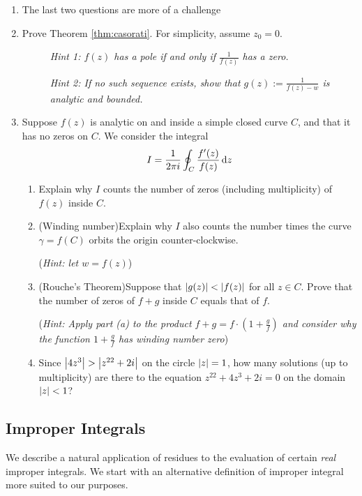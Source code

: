 \begin{exercises*}
\begin{enumerate}
  \item[]The last two questions are more of a challenge

	\item Prove Theorem \ref{thm:casorati}. For simplicity, assume $z_0=0$.
	\begin{description}  	
  	\item[]\emph{Hint 1: $f(z)$ has a pole if and only if $\frac 1{f(z)}$ has a zero.}
  	\item[]\emph{Hint 2: If no such sequence exists, show that $g(z):=\frac 1{f(z)-w}$ is analytic and bounded.}
	\end{description}
	
	  
  \item Suppose $f(z)$ is analytic on and inside a simple closed curve $C$, and that it has no zeros on $C$. We consider the integral
  \[I=\frac 1{2\pi i}\oint_C\frac{f'(z)}{f(z)}\,{\mathrm{d} z}\]
  \begin{enumerate}
    \item Explain why $I$ counts the number of zeros (including multiplicity) of $f(z)$ inside $C$.
    \item (Winding number)\quad Explain why $I$ also counts the number times the curve $\gamma=f(C)$ orbits the origin counter-clockwise.\par
    (\emph{Hint: let $w=f(z)$})
    \item (Rouche's Theorem)\quad Suppose that $\left| g(z)\right|<\left| f(z)\right|$ for all $z\in C$. Prove that the number of zeros of $f+g$ inside $C$ equals that of $f$.\par
    (\emph{Hint: Apply part (a) to the product $f+g=f\cdot(1+\frac gf)$ and consider why the function $1+\frac gf$ has winding number zero})
    \item Since $\nm{4z^3}>\nm{z^{22}+2i}$ on the circle $\left| z\right|=1$, how many solutions (up to multiplicity) are there to the equation $z^{22}+4z^3+2i=0$ on the domain $\left| z\right|<1$?
  \end{enumerate}

\end{enumerate}
\end{exercises*}
\clearpage

\subsection{Improper Integrals}

We describe a natural application of residues to the evaluation of certain \emph{real} improper integrals. We start with an alternative definition of improper integral more suited to our purposes.

